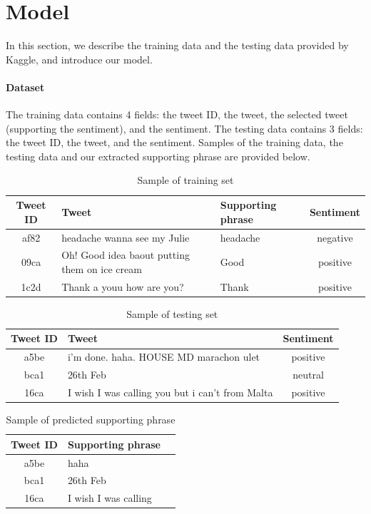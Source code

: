 \section{Model} \label{sec:model}

In this section, we describe the training data and the testing data provided by Kaggle, and introduce our model. 

\paragraph{Dataset}

The training data contains 4 fields: the tweet ID, the tweet, the selected tweet (supporting the sentiment), and the sentiment. The testing data contains 3 fields: the tweet ID, the tweet, and the sentiment. Samples of the training data, the testing data and our extracted supporting phrase are provided below.

\begin{table}[!h]
	\centering
	\begin{tabular} {c | l l c}
	Tweet ID & Tweet & Supporting phrase & Sentiment \\
	\hline
	af82 & headache wanna see my Julie & headache & negative \\
    09ca & Oh! Good idea baout putting them on ice cream & Good & positive \\
	1c2d & Thank a youu  how are you? & Thank & positive
	\end{tabular}
	\caption{Sample of training set}
\end{table} 

\begin{table}[!h]
	\centering
	\begin{tabular} {c | l c}
	Tweet ID & Tweet & Sentiment \\
	\hline
	a5be & i'm done. haha. HOUSE MD marachon ulet & positive \\
	bca1 & 26th Feb & neutral \\
	16ca & I wish I was calling you but i can't from Malta & positive 
	\end{tabular}
	\caption{Sample of testing set}
\end{table} 

\begin{table}[!h]
	\centering
	\begin{tabular} {c | l c}
	Tweet ID & Supporting phrase \\
	\hline
	a5be & haha \\
	bca1 & 26th Feb \\
	16ca & I wish I was calling 
	\end{tabular}
	\caption{Sample of predicted supporting phrase}
\end{table} 

